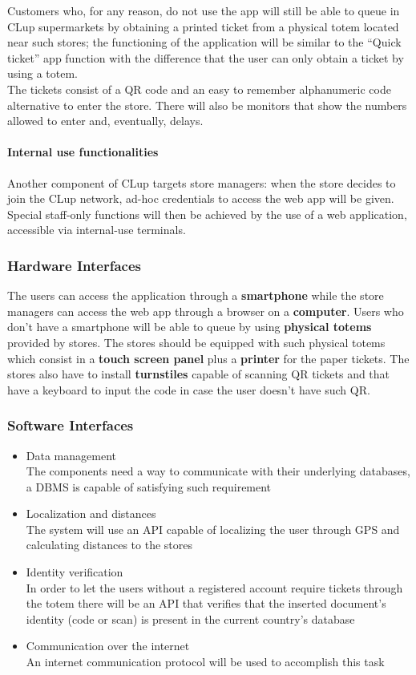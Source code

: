 Customers who, for any reason, do not use the app will still be able to queue in CLup supermarkets by obtaining a printed ticket from a physical totem located near such stores; the functioning of the application will be similar to the “Quick ticket” app function with the difference that the user can only obtain a ticket by using a totem. \\
The tickets consist of a QR code and an easy to remember alphanumeric code alternative to enter the store. There will also be monitors that show the numbers allowed to enter and, eventually, delays.
\paragraph{Internal use functionalities}
Another component of CLup targets store managers: when the store decides to join the CLup network, ad-hoc credentials to access the web app will be given. Special staff-only functions will then be achieved by the use of a web application, accessible via internal-use terminals.

\subsubsection{Hardware Interfaces}
The users can access the application through a \textbf{smartphone} while the store managers can access the web app through a browser on a \textbf{computer}. Users who don't have a smartphone will be able to queue by using \textbf{physical totems} provided by stores.
The stores should be equipped with such physical totems which consist in a \textbf{touch screen panel} plus a \textbf{printer} for the paper tickets. The stores also have to install \textbf{turnstiles} capable of scanning QR tickets and that have a keyboard to input the code in case the user doesn't have such QR.
\subsubsection{Software Interfaces}
\begin{itemize}
    \item Data management\\
The components need a way to communicate with their underlying databases, a DBMS is capable of satisfying such requirement
    \item Localization and distances\\
The system will use an API capable of localizing the user through GPS and calculating distances to the stores\
    \item Identity verification\\
In order to let the users without a registered account require tickets through the totem there will be an API that verifies that the inserted document’s identity (code or scan) is present in the current country’s database
    \item Communication over the internet\\
An internet communication protocol will be used to accomplish this task
\end{itemize}

